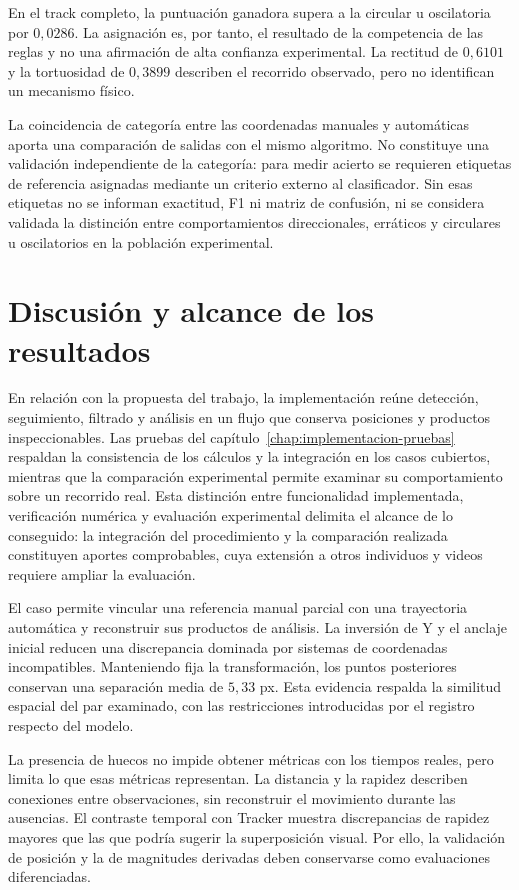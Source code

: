 En el track completo, la puntuación ganadora supera a la circular u oscilatoria por $0{,}0286$. La asignación es, por tanto, el resultado de la competencia de las reglas y no una afirmación de alta confianza experimental. La rectitud de $0{,}6101$ y la tortuosidad de $0{,}3899$ describen el recorrido observado, pero no identifican un mecanismo físico.

La coincidencia de categoría entre las coordenadas manuales y automáticas aporta una comparación de salidas con el mismo algoritmo. No constituye una validación independiente de la categoría: para medir acierto se requieren etiquetas de referencia asignadas mediante un criterio externo al clasificador. Sin esas etiquetas no se informan exactitud, F1 ni matriz de confusión, ni se considera validada la distinción entre comportamientos direccionales, erráticos y circulares u oscilatorios en la población experimental.

\section{Discusión y alcance de los resultados}

En relación con la propuesta del trabajo, la implementación reúne detección, seguimiento, filtrado y análisis en un flujo que conserva posiciones y productos inspeccionables. Las pruebas del capítulo~\ref{chap:implementacion-pruebas} respaldan la consistencia de los cálculos y la integración en los casos cubiertos, mientras que la comparación experimental permite examinar su comportamiento sobre un recorrido real. Esta distinción entre funcionalidad implementada, verificación numérica y evaluación experimental delimita el alcance de lo conseguido: la integración del procedimiento y la comparación realizada constituyen aportes comprobables, cuya extensión a otros individuos y videos requiere ampliar la evaluación.

El caso permite vincular una referencia manual parcial con una trayectoria automática y reconstruir sus productos de análisis. La inversión de Y y el anclaje inicial reducen una discrepancia dominada por sistemas de coordenadas incompatibles. Manteniendo fija la transformación, los puntos posteriores conservan una separación media de $5{,}33$ px. Esta evidencia respalda la similitud espacial del par examinado, con las restricciones introducidas por el registro respecto del modelo.

La presencia de huecos no impide obtener métricas con los tiempos reales, pero limita lo que esas métricas representan. La distancia y la rapidez describen conexiones entre observaciones, sin reconstruir el movimiento durante las ausencias. El contraste temporal con Tracker muestra discrepancias de rapidez mayores que las que podría sugerir la superposición visual. Por ello, la validación de posición y la de magnitudes derivadas deben conservarse como evaluaciones diferenciadas.

